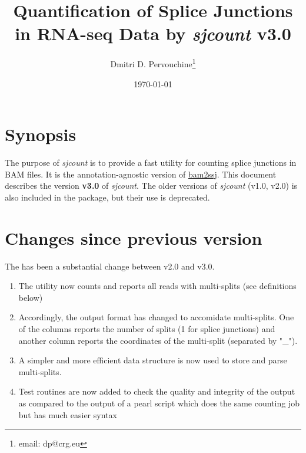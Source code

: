 \documentclass{article}
\begin{document}
\title{Quantification of Splice Junctions in RNA-seq Data by {\em sjcount} v3.0}

\author{Dmitri D. Pervouchine\thanks{email: dp@crg.eu}}

\date{\today}
\maketitle
\tableofcontents

\section{Synopsis}

The purpose of {\em sjcount} is to provide a fast utility for counting splice junctions in BAM files. 
It is the annotation-agnostic version of \href{https://github.com/pervouchine/bam2ssj}{bam2ssj}. 
This document describes the version {\bf v3.0} of {\em sjcount}. The older versions of {\em sjcount}
(v1.0, v2.0) is also included in the package, but their use is deprecated.

\section{Changes since previous version}
The has been a substantial change between v2.0 and v3.0.
\begin{enumerate}
\item The utility now counts and reports all reads with multi-splits (see definitions below)
\item Accordingly, the output format has changed to accomidate multi-splits. One of the columns reports 
the number of splits (1 for splice junctions) and another column reports the coordinates of the multi-split (separated by "\_"). 
\item A simpler and more efficient data structure is now used to store and parse multi-splits.
\item Test routines are now added to check the quality and integrity of the output as compared to the output of 
a pearl script which does the same counting job but has much easier syntax
\end{enumerate}
\end{document}
